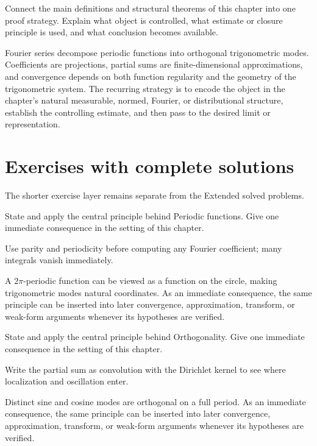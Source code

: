 \begin{problem}\label{prob:iii09-problem-12}
Connect the main definitions and structural theorems of this chapter into one proof strategy. Explain what object is controlled, what estimate or closure principle is used, and what conclusion becomes available.
\end{problem}
\begin{solution}
Fourier series decompose periodic functions into orthogonal trigonometric modes. Coefficients are projections, partial sums are finite-dimensional approximations, and convergence depends on both function regularity and the geometry of the trigonometric system. The recurring strategy is to encode the object in the chapter's natural measurable, normed, Fourier, or distributional structure, establish the controlling estimate, and then pass to the desired limit or representation.
\end{solution}
\section{Exercises with complete solutions}
The shorter exercise layer remains separate from the Extended solved problems.

\begin{exercise}\label{exr:iii09-01}
State and apply the central principle behind Periodic functions. Give one immediate consequence in the setting of this chapter.
\end{exercise}
\begin{hint}
Use parity and periodicity before computing any Fourier coefficient; many integrals vanish immediately.
\end{hint}
\begin{solution}
A $2\pi$-periodic function can be viewed as a function on the circle, making trigonometric modes natural coordinates. As an immediate consequence, the same principle can be inserted into later convergence, approximation, transform, or weak-form arguments whenever its hypotheses are verified.
\end{solution}

\begin{exercise}\label{exr:iii09-02}
State and apply the central principle behind Orthogonality. Give one immediate consequence in the setting of this chapter.
\end{exercise}
\begin{hint}
Write the partial sum as convolution with the Dirichlet kernel to see where localization and oscillation enter.
\end{hint}
\begin{solution}
Distinct sine and cosine modes are orthogonal on a full period. As an immediate consequence, the same principle can be inserted into later convergence, approximation, transform, or weak-form arguments whenever its hypotheses are verified.
\end{solution}

